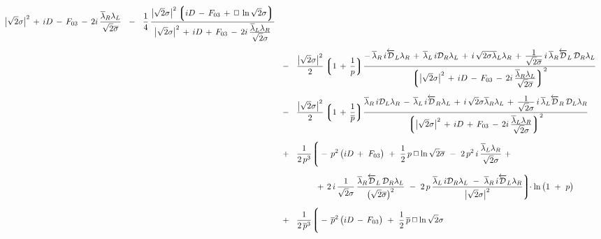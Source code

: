 \documentclass[epsfig,12pt]{article}
\newcommand{\ov}{\overline}
\newcommand{\md}{\mathcal{D}}
\newcommand{\lgr}{\left\lgroup}
\newcommand{\rgr}{\right\rgroup}
\begin{document}
\begin{align}
{			}
			{
				\big|\sqrt{2}\sigma\big|^2 \,+\, iD \,-\, F_{03} 
				\,-\, 2i\,\frac{\displaystyle \ov\lambda{}_R\lambda_L}{\displaystyle \sqrt{2}\ov\sigma}
			}
		~~-~~  \frac{1}{4}\,
			\frac{
				\big|\sqrt{2}\sigma\big|^2
				\lgr iD \,-\, F_{03} \,+\, \Box\, \ln \sqrt{2}\sigma \rgr
			}
			{
				\big|\sqrt{2}\sigma\big|^2 \,+\, iD \,+\, F_{03} 
				\,-\, 2i\,\frac{\displaystyle \ov\lambda{}_L\lambda_R}{\displaystyle \sqrt{2}\sigma}
			}
	\\[2mm]
%
\notag
	&
		~~-~~  \frac{\big|\sqrt{2}\sigma\big|^2}{2}
			\lgr 1 \,+\, \frac{1}{p} \rgr \!
			\frac{ 
				-\, \ov\lambda{}_R\, i\overleftarrow{\md}_L \lambda_R  \,+\, \ov{\lambda}{}_L\, i\md_R \lambda_L \,+\,
				i\,\sqrt{2}\ov{\sigma \lambda}{}_L \lambda_R
				\,+\, \frac{\displaystyle 1}{\displaystyle \sqrt{2}\ov\sigma}\,
					i\, \ov\lambda{}_R \overleftarrow{\md}_L\, \md_R\lambda_L
			}
			{
			\lgr  
				\big|\sqrt{2}\sigma\big|^2 \,+\, iD \,-\, F_{03} 
				\,-\, 2i\,\frac{\displaystyle \ov\lambda{}_R\lambda_L}{\displaystyle \sqrt{2}\ov\sigma}  
			\rgr^2
			}
	\\[2mm]
%
\notag
	&
		~~-~~  \frac{\big|\sqrt{2}\sigma\big|^2}{2}
			\lgr 1 \,+\, \frac{1}{\ov p} \rgr\!
			\frac{
				\ov\lambda{}_R\, i\md_L\lambda_R \,-\, \ov\lambda{}_L\, i\overleftarrow{\md}_R \lambda_L \,+\,
				i\,\sqrt{2}\sigma \ov\lambda{}_R \lambda_L
				\,+\, \frac{\displaystyle 1}{\displaystyle \sqrt{2}\sigma}\,
					i\, \ov\lambda{}_L \overleftarrow{\md}_R\, \md_L\lambda_R
			}
			{
			\lgr
				\big|\sqrt{2}\sigma\big|^2 \,+\, iD \,+\, F_{03} 
				\,-\, 2i\,\frac{\displaystyle \ov\lambda{}_L\lambda_R}{\displaystyle \sqrt{2}\sigma}
			\rgr^2
			}
	\\[2mm]
%
	&
		~~+~~  \frac{1}{2\, p^3}
			\Bigg\lgroup
				-\, p^2\, \big( iD \,+\ F_{03} \big)
				~+~  \frac{1}{2}\, p\, \Box \ln \sqrt{2}\ov\sigma
				~-~  2\, p^2\, i\, \frac{\ov\lambda{}_L \lambda_R}{\sqrt{2}\sigma}  ~+~
	\\[2mm]
%
\notag
	&
		\phantom{~~+~~  \frac{1}{2\, p^3} \Bigg\lgroup}
				+\, 2\, i\, \frac{1}{\sqrt{2}\sigma}\, 
					\frac{\ov\lambda{}_R \overleftarrow{\md}_L\, \md_R\lambda_L}{\big(\sqrt{2}\ov\sigma\big)^2}
				~-~  2\, p\, 
					\frac{\ov\lambda{}_L\, i\md_R \lambda_L ~-~ \ov\lambda{}_R\, i\overleftarrow{\md}_L \lambda_R}{\big|\sqrt{2}\sigma\big|^2}
			\Bigg\rgroup\!\!
		\cdot \ln \big( 1 ~+~ p \big)
	\\[2mm]
%
\notag
	&
		~~+~~  \frac{1}{2\, \ov p{}^3}
			\Bigg\lgroup
				-\, \ov p{}^2\, \big( iD \,-\, F_{03} \big)
				~+~  \frac{1}{2}\, \ov p\, \Box \ln \sqrt{2}\sigma

\end{align}
\end{document}
